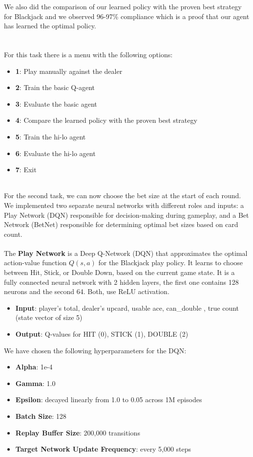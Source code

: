 \documentclass{article}
\begin{document}
\noindent We also did the comparison of our learned policy with the 
proven best strategy for Blackjack and we observed 96-97\%
compliance which is a proof that our agent has learned the optimal policy.\\\\

\\
\noindent For this task there is a menu with the following options:
\begin{itemize}
  \item {\bf 1}: Play manually against the dealer
  \item {\bf 2}: Train the basic Q-agent
  \item {\bf 3}: Evaluate the basic agent
  \item {\bf 4}: Compare the learned policy with the proven best strategy
  \item {\bf 5}: Train the hi-lo agent
  \item {\bf 6}: Evaluate the hi-lo agent
  \item {\bf 7}: Exit
\end{itemize}


\\
For the second task, we can now choose the bet size at the start of each round.
We implemented two separate neural networks with different roles and 
inputs: a Play Network (DQN) responsible for decision-making during 
gameplay, and a Bet Network (BetNet) responsible for determining 
optimal bet sizes based on card count.\\\\

\noindent The {\bf Play Network} is a Deep Q-Network (DQN) that approximates the optimal 
action-value function 
$Q(s,a)$ for the Blackjack play policy. It learns to choose between Hit, 
Stick, or Double Down, based on the current game state. It is a 
fully connected neural network with 2 hidden layers, 
the first one contains 128 neurons and the second 64.
Both, use ReLU activation.
\begin{itemize}
  \item {\bf Input}: player's total, dealer's upcard, usable ace, can\_double , true count (state vector of size 5)
  \item {\bf Output}: Q-values for HIT (0), STICK (1), DOUBLE (2)
\end{itemize}

\newpage

\noindent We have chosen the following hyperparameters for the DQN:
\begin{itemize}
  \item {\bf Alpha}: 1e-4 
  \item {\bf Gamma}: 1.0
  \item {\bf Epsilon}: decayed linearly from 1.0 to 0.05 across 1M episodes
  \item {\bf Batch Size}: 128
  \item {\bf Replay Buffer Size}: 200,000 transitions
  \item {\bf Target Network Update Frequency}: every 5,000 steps
\end{itemize}
\end{document}
